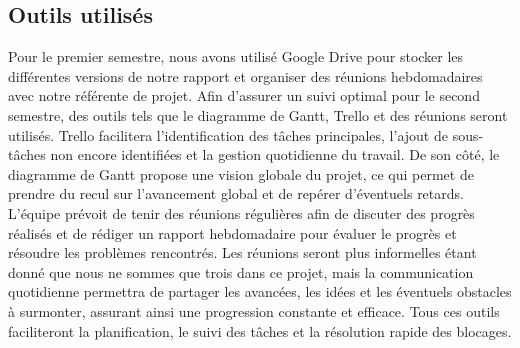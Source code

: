 \subsection{Outils utilisés}

Pour le premier semestre, nous avons utilisé Google Drive pour stocker les 
différentes versions de notre rapport et organiser des réunions hebdomadaires 
avec notre référente de projet. Afin d'assurer un suivi optimal pour le second semestre, des outils tels que le diagramme de Gantt, 
Trello et des réunions seront utilisés. Trello facilitera l'identification des tâches principales, l'ajout de 
sous-tâches non encore identifiées et la gestion quotidienne du travail. 
De son côté, le diagramme de Gantt propose une vision globale du projet, ce qui 
permet de prendre du recul sur l'avancement global et de repérer d'éventuels 
retards. L'équipe prévoit de tenir des réunions régulières afin de discuter des 
progrès réalisés et de rédiger un rapport hebdomadaire pour évaluer le progrès et 
résoudre les problèmes rencontrés. Les réunions seront plus informelles étant 
donné que nous ne sommes que trois dans ce projet, mais la communication 
quotidienne permettra de partager les avancées, les idées et les éventuels 
obstacles à surmonter, assurant ainsi une progression constante et efficace. 
Tous ces outils faciliteront la planification, le suivi des tâches et la 
résolution rapide des blocages.
